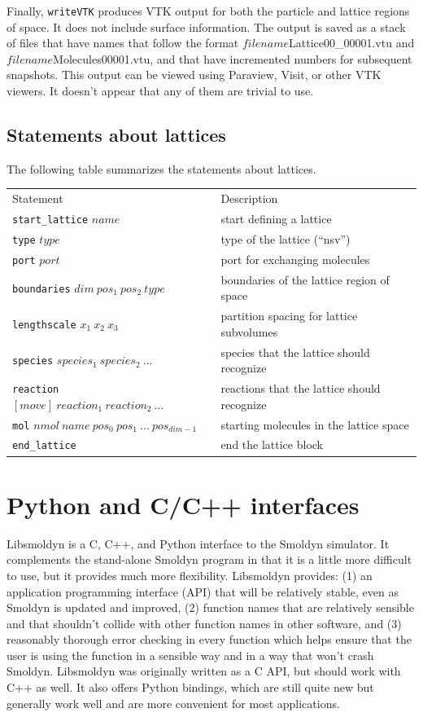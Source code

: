 \documentclass {book}
\newcommand {\ttt} {\texttt}
\begin{document}
Finally, \ttt{writeVTK} produces VTK output for both the particle and lattice regions of space. It does not include surface information. The output is saved as a stack of files that have names that follow the format $filename$Lattice00\_00001.vtu and $filename$Molecules00001.vtu, and that have incremented numbers for subsequent snapshots. This output can be viewed using Paraview, Visit, or other VTK viewers. It doesn't appear that any of them are trivial to use.

\section{Statements about lattices}

The following table summarizes the statements about lattices.

\begin{longtable}[c]{ll}
Statement & Description\\
\ttt{start\_lattice} $name$ & start defining a lattice\\
\ttt{type} $type$ & type of the lattice (``nsv'')\\
\ttt{port} $port$ & port for exchanging molecules\\
\ttt{boundaries} $dim\ pos_1\ pos_2\ type$ & boundaries of the lattice region of space\\
\ttt{lengthscale} $x_1\ x_2\ x_3$ & partition spacing for lattice subvolumes\\
\ttt{species} $species_1\ species_2\ ...$ & species that the lattice should recognize\\
\ttt{reaction} $[move]\ reaction_1\ reaction_2\ ...$ & reactions that the lattice should recognize\\
\ttt{mol} $nmol\ name\ pos_0\ pos_1\ ...\ pos_{dim-1}$ & starting molecules in the lattice space\\
\ttt{end\_lattice} & end the lattice block
\end{longtable}


\chapter{Python and C/C++ interfaces}

Libsmoldyn is a C, C++, and Python interface to the Smoldyn simulator. It complements the stand-alone Smoldyn program in that it is a little more difficult to use, but it provides much more flexibility. Libsmoldyn provides: (1) an application programming interface (API) that will be relatively stable, even as Smoldyn is updated and improved, (2) function names that are relatively sensible and that shouldn't collide with other function names in other software, and (3) reasonably thorough error checking in every function which helps ensure that the user is using the function in a sensible way and in a way that won't crash Smoldyn. Libsmoldyn was originally written as a C API, but should work with C++ as well. It also offers Python bindings, which are still quite new but generally work well and are more convenient for most applications.
\end{document}
